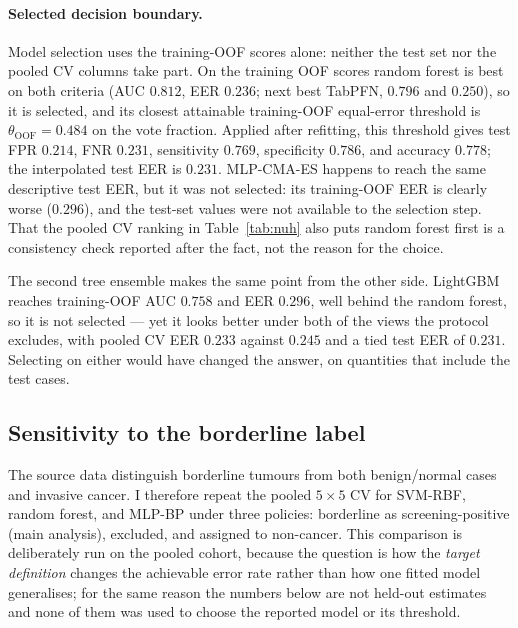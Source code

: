 \documentclass[11pt,a4paper]{article}
\begin{document}
\paragraph{Selected decision boundary.}
Model selection uses the training-OOF scores alone: neither the test set nor the pooled CV columns take part. On the training OOF scores random forest is best on both criteria (AUC $0.812$, EER $0.236$; next best TabPFN, $0.796$ and $0.250$), so it is selected, and its closest attainable training-OOF equal-error threshold is $\theta_{\mathrm{OOF}}=0.484$ on the vote fraction. Applied after refitting, this threshold gives test FPR $0.214$, FNR $0.231$, sensitivity $0.769$, specificity $0.786$, and accuracy $0.778$; the interpolated test EER is $0.231$. MLP-CMA-ES happens to reach the same descriptive test EER, but it was not selected: its training-OOF EER is clearly worse ($0.296$), and the test-set values were not available to the selection step. That the pooled CV ranking in Table~\ref{tab:nuh} also puts random forest first is a consistency check reported after the fact, not the reason for the choice.

The second tree ensemble makes the same point from the other side. LightGBM reaches training-OOF AUC $0.758$ and EER $0.296$, well behind the random forest, so it is not selected --- yet it looks better under both of the views the protocol excludes, with pooled CV EER $0.233$ against $0.245$ and a tied test EER of $0.231$. Selecting on either would have changed the answer, on quantities that include the test cases.

\FloatBarrier
\subsection{Sensitivity to the borderline label}
\label{sec:borderline}
The source data distinguish borderline tumours from both benign/normal cases and invasive cancer. I therefore repeat the pooled $5\times5$ CV for SVM-RBF, random forest, and MLP-BP under three policies: borderline as screening-positive (main analysis), excluded, and assigned to non-cancer. This comparison is deliberately run on the pooled cohort, because the question is how the \emph{target definition} changes the achievable error rate rather than how one fitted model generalises; for the same reason the numbers below are not held-out estimates and none of them was used to choose the reported model or its threshold.
\end{document}
